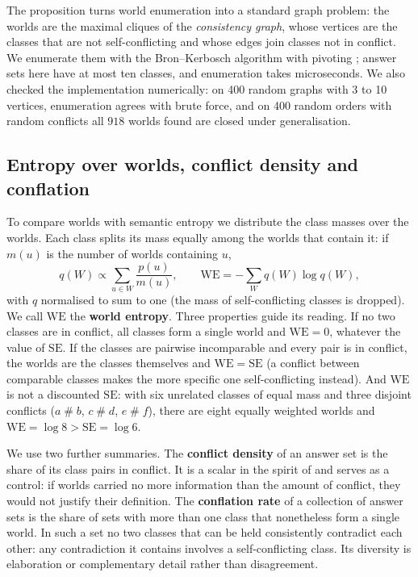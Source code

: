 \documentclass[english]{desafiokunumi}
\theoremstyle{definition}
\theoremstyle{remark}
\newcommand{\SE}{\mathrm{SE}}
\newcommand{\WE}{\mathrm{WE}}
\newcommand{\cf}{\mathrel{\#}}
\begin{document}
The proposition turns world enumeration into a standard graph problem: the
worlds are the maximal cliques of the \emph{consistency graph}, whose vertices
are the classes that are not self-conflicting and whose edges join classes not
in conflict. We enumerate them with the Bron--Kerbosch algorithm with pivoting
\citep{bron1973algorithm}; answer sets here have at most ten classes, and
enumeration takes microseconds. We also checked the implementation
numerically: on 400 random graphs with 3 to 10 vertices, enumeration agrees
with brute force, and on 400 random orders with random conflicts all $918$
worlds found are closed under generalisation.

\subsection{Entropy over worlds, conflict density and conflation}
\label{sec:we}

To compare worlds with semantic entropy we distribute the class masses over
the worlds. Each class splits its mass equally among the worlds that contain
it: if $m(u)$ is the number of worlds containing $u$,
\begin{equation}
\label{eq:we}
q(W) \propto \sum_{u \in W} \frac{p(u)}{m(u)}, \qquad
\WE = -\sum_{W} q(W) \log q(W),
\end{equation}
with $q$ normalised to sum to one (the mass of self-conflicting classes is
dropped). We call $\WE$ the \textbf{world entropy}. Three properties guide its
reading. If no two classes are in conflict, all classes form a single world
and $\WE = 0$, whatever the value of $\SE$. If the classes are pairwise
incomparable and every pair is in conflict, the worlds are the classes
themselves and $\WE = \SE$ (a conflict between comparable classes makes the
more specific one self-conflicting instead). And $\WE$ is
not a discounted $\SE$: with six unrelated classes of equal mass and three
disjoint conflicts ($a \cf b$, $c \cf d$, $e \cf f$), there are eight equally
weighted worlds and $\WE = \log 8 > \SE = \log 6$.

We use two further summaries. The \textbf{conflict density} of an answer set is
the share of its class pairs in conflict. It is a scalar in the spirit of
\citet{lgu2026logical} and serves as a control: if worlds carried no more
information than the amount of conflict, they would not justify their
definition. The \textbf{conflation rate} of a collection of answer sets is the
share of sets with more than one class that nonetheless form a single world.
In such a set no two classes that can be held consistently contradict each
other: any contradiction it contains involves a self-conflicting class. Its
diversity is elaboration or complementary detail rather than disagreement.
\end{document}
